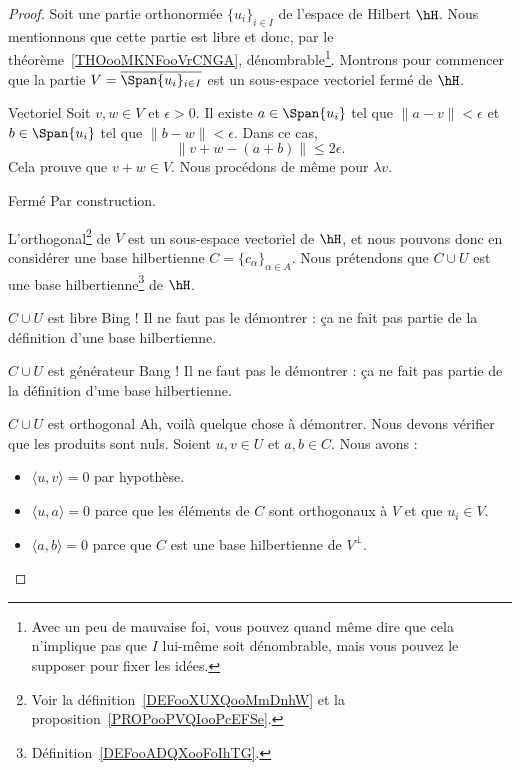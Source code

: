 \begin{proof}
    Soit une partie orthonormée \( \{ u_i \}_{i\in I}\) de l'espace de Hilbert \( \hH\). Nous mentionnons que cette partie est libre et donc, par le théorème~\ref{THOooMKNFooVrCNGA}, dénombrable\footnote{Avec un peu de mauvaise foi, vous pouvez quand même dire que cela n'implique pas que \( I\) lui-même soit dénombrable, mais vous pouvez le supposer pour fixer les idées.}.  Montrons pour commencer que la partie \( V=\overline{\Span\{ u_i \}_{i\in I}}\) est un sous-espace vectoriel fermé de \( \hH\).
    \begin{subproof}
        \item[Vectoriel] Soit \( v,w\in V\) et \( \epsilon>0\). Il existe \( a\in \Span\{ u_i \}\) tel que \( \| a-v \|<\epsilon\) et \( b\in \Span\{ u_i \}\) tel que \( \| b-w \|<\epsilon\). Dans ce cas,
            \begin{equation}
                \| v+w-(a+b) \|\leq 2\epsilon.
            \end{equation}
            Cela prouve que \( v+w\in V\). Nous procédons de même pour \( \lambda v\).
        \item[Fermé] Par construction.
    \end{subproof}

    L'orthogonal\footnote{Voir la définition~\ref{DEFooXUXQooMmDnhW} et la proposition~\ref{PROPooPVQIooPcEFSe}.} de \( V\) est un sous-espace vectoriel de \( \hH\), et nous pouvons donc en considérer une base hilbertienne \( C=\{ c_{\alpha} \}_{\alpha\in A}\). Nous prétendons que \( C\cup U\) est une base hilbertienne\footnote{Définition~\ref{DEFooADQXooFoIhTG}.} de \( \hH\).
    \begin{subproof}
        \item[\( C\cup U\) est libre]
            Bing ! Il ne faut pas le démontrer : ça ne fait pas partie de la définition d'une base hilbertienne.
        \item[\( C\cup U\) est générateur]
            Bang ! Il ne faut pas le démontrer : ça ne fait pas partie de la définition d'une base hilbertienne.
        \item[\( C\cup U\) est orthogonal]
            Ah, voilà quelque chose à démontrer. Nous devons vérifier que les produits sont nuls. Soient \( u,v\in U\) et \( a,b\in C\). Nous avons :
            \begin{itemize}
                \item \( \langle u, v\rangle =0\) par hypothèse.
                \item \( \langle u, a\rangle =0\) parce que les éléments de \( C\) sont orthogonaux à \( V\) et que \( u_i\in V\).
                \item \( \langle a, b\rangle =0\) parce que \( C\) est une base hilbertienne de \( V^{\perp}\).
            \end{itemize}


\end{subproof}
\end{proof}
